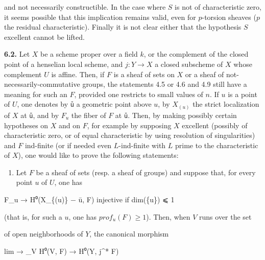 \documentclass[
  11pt,
  a4paper,
]{book}
\newenvironment{Shaded}{}{}
\newcommand{\NormalTok}[1]{#1}
\providecommand{\tightlist}{%
  \setlength{\itemsep}{0pt}\setlength{\parskip}{0pt}}
\begin{document}
and not necessarily constructible. In the case where \(S\) is not of
characteristic zero, it seems possible that this implication remains
valid, even for \(p\)-torsion sheaves (\(p\) the residual
characteristic). Finally it is not clear either that the hypothesis
\(S\) excellent cannot be lifted.

\textbf{6.2.} Let \(X\) be a scheme proper over a field \(k\), or the
complement of the closed point of a henselian local scheme, and
\(j : Y \to X\) a closed subscheme of \(X\) whose complement \(U\) is
affine. Then, if \(F\) is a sheaf of sets on \(X\) or a sheaf of
not-necessarily-commutative groups, the statements 4.5 or 4.6 and 4.9
still have a meaning for such an \(F\), provided one restricts to small
values of \(n\). If \(u\) is a point of \(U\), one denotes by \texttt{ū}
a geometric point above \(u\), by \(X_{(u)}\) the strict localization of
\(X\) at \texttt{ū}, and by \(F_{u}\) the fiber of \(F\) at \texttt{ū}.
Then, by making possibly certain hypotheses on \(X\) and on \(F\), for
example by supposing \(X\) excellent (possibly of characteristic zero,
or of equal characteristic by using resolution of singularities) and
\(F\) ind-finite (or if needed even \(L\)-ind-finite with \(L\) prime to
the characteristic of \(X\)), one would like to prove the following
statements:

\begin{enumerate}
\def\labelenumi{\alph{enumi})}
\tightlist
\item
  Let \(F\) be a sheaf of sets (resp. a sheaf of groups) and suppose
  that, for every point \(u\) of \(U\), one has
\end{enumerate}

\begin{Shaded}
\begin{Highlighting}[]
\NormalTok{F\_u → H⁰(X\_\{(u)\} − ū, F)  injective if dim(\{u\}) ⩽ 1}
\end{Highlighting}
\end{Shaded}

(that is, for such a \(u\), one has \(prof_{u}(F) \geqslant 1\)). Then,
when \(V\) runs over the set

of open neighborhoods of \(Y\), the canonical morphism

\begin{Shaded}
\begin{Highlighting}[]
\NormalTok{lim → \_V H⁰(V, F) → H⁰(Y, j\^{}* F)}
\end{Highlighting}
\end{Shaded}
\end{document}
